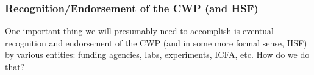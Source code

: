 \begin{frame}
\frametitle{Recognition/Endorsement of the CWP (and HSF)}

One important thing we will presumably need to accomplish is eventual 
recognition and endorsement of the CWP (and in some more formal sense, HSF) 
by various entities: funding agencies, labs, experiments, ICFA, etc. 
\vskip 0.15in
How do we do that?

\end{frame}



